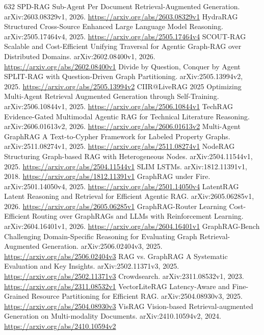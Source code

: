 \documentclass[11pt]{article}
\begin{document}
\begin{thebibliography}{632}
 SPD-RAG Sub-Agent Per Document Retrieval-Augmented Generation. arXiv:2603.08329v1, 2026. \url{https://arxiv.org/abs/2603.08329v1}
 HydraRAG Structured Cross-Source Enhanced Large Language Model Reasoning. arXiv:2505.17464v4, 2025. \url{https://arxiv.org/abs/2505.17464v4}
 SCOUT-RAG Scalable and Cost-Efficient Unifying Traversal for Agentic Graph-RAG over Distributed Domains. arXiv:2602.08400v1, 2026. \url{https://arxiv.org/abs/2602.08400v1}
 Divide by Question, Conquer by Agent SPLIT-RAG with Question-Driven Graph Partitioning. arXiv:2505.13994v2, 2025. \url{https://arxiv.org/abs/2505.13994v2}
 CIIR@LiveRAG 2025 Optimizing Multi-Agent Retrieval Augmented Generation through Self-Training. arXiv:2506.10844v1, 2025. \url{https://arxiv.org/abs/2506.10844v1}
 TechRAG Evidence-Gated Multimodal Agentic RAG for Technical Literature Reasoning. arXiv:2606.01613v2, 2026. \url{https://arxiv.org/abs/2606.01613v2}
 Multi-Agent GraphRAG A Text-to-Cypher Framework for Labeled Property Graphs. arXiv:2511.08274v1, 2025. \url{https://arxiv.org/abs/2511.08274v1}
 NodeRAG Structuring Graph-based RAG with Heterogeneous Nodes. arXiv:2504.11544v1, 2025. \url{https://arxiv.org/abs/2504.11544v1}
 SLIM LSTMs. arXiv:1812.11391v1, 2018. \url{https://arxiv.org/abs/1812.11391v1}
 GraphRAG under Fire. arXiv:2501.14050v4, 2025. \url{https://arxiv.org/abs/2501.14050v4}
 LatentRAG Latent Reasoning and Retrieval for Efficient Agentic RAG. arXiv:2605.06285v1, 2026. \url{https://arxiv.org/abs/2605.06285v1}
 GraphRAG-Router Learning Cost-Efficient Routing over GraphRAGs and LLMs with Reinforcement Learning. arXiv:2604.16401v1, 2026. \url{https://arxiv.org/abs/2604.16401v1}
 GraphRAG-Bench Challenging Domain-Specific Reasoning for Evaluating Graph Retrieval-Augmented Generation. arXiv:2506.02404v3, 2025. \url{https://arxiv.org/abs/2506.02404v3}
 RAG vs. GraphRAG A Systematic Evaluation and Key Insights. arXiv:2502.11371v3, 2025. \url{https://arxiv.org/abs/2502.11371v3}
 Crowdsearch. arXiv:2311.08532v1, 2023. \url{https://arxiv.org/abs/2311.08532v1}
 VectorLiteRAG Latency-Aware and Fine-Grained Resource Partitioning for Efficient RAG. arXiv:2504.08930v3, 2025. \url{https://arxiv.org/abs/2504.08930v3}
 VisRAG Vision-based Retrieval-augmented Generation on Multi-modality Documents. arXiv:2410.10594v2, 2024. \url{https://arxiv.org/abs/2410.10594v2}

\end{thebibliography}
\end{document}
